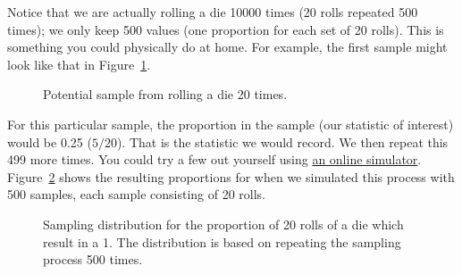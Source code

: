 \documentclass[
  letterpaper,
  DIV=11,
  numbers=noendperiod]{scrreprt}
\theoremstyle{definition}
\theoremstyle{definition}
\theoremstyle{plain}
\theoremstyle{remark}
\begin{document}
Notice that we are actually rolling a die 10000 times (20 rolls repeated
500 times); we only keep 500 values (one proportion for each set of 20
rolls). This is something you could physically do at home. For example,
the first sample might look like that in
Figure~\ref{fig-samplingdistns-dice-example}.

\begin{figure}


\caption{\label{fig-samplingdistns-dice-example}Potential sample from
rolling a die 20 times.}

\end{figure}%

For this particular sample, the proportion in the sample (our statistic
of interest) would be 0.25 (\(5/20\)). That is the statistic we would
record. We then repeat this 499 more times. You could try a few out
yourself using \href{https://www.random.org/dice/?num=20}{an online
simulator}. Figure~\ref{fig-samplingdistns-dice-dotplot} shows the
resulting proportions for when we simulated this process with 500
samples, each sample consisting of 20 rolls.

\begin{figure}


\caption{\label{fig-samplingdistns-dice-dotplot}Sampling distribution
for the proportion of 20 rolls of a die which result in a 1. The
distribution is based on repeating the sampling process 500 times.}

\end{figure}%
\end{document}
